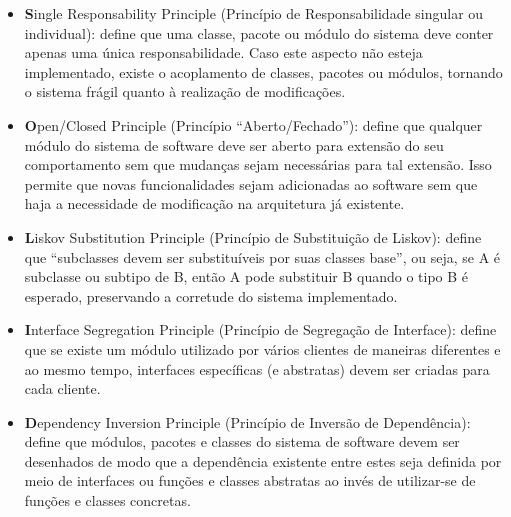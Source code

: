 \begin{itemize}

	\item \textbf{S}ingle Responsability Principle (Princípio de Responsabilidade singular ou individual): define que uma classe, pacote ou módulo do sistema deve conter apenas uma única responsabilidade. Caso este aspecto não esteja implementado, existe o acoplamento de classes, pacotes ou módulos, tornando o sistema frágil quanto à realização de modificações.
	\item \textbf{O}pen/Closed Principle (Princípio “Aberto/Fechado”): define que qualquer módulo do sistema de software deve ser aberto para extensão do seu comportamento sem que mudanças sejam necessárias para tal extensão. Isso permite que novas funcionalidades sejam adicionadas ao software sem que haja a necessidade de modificação na arquitetura já existente.
	\item \textbf{L}iskov Substitution Principle (Princípio de Substituição de Liskov): define que “subclasses devem ser substituíveis por suas classes base”, ou seja, se A é subclasse ou subtipo de B, então A pode substituir B quando o tipo B é esperado, preservando a corretude do sistema implementado.
	\item \textbf{I}nterface Segregation Principle (Princípio de Segregação de Interface): define que se existe um módulo utilizado por vários clientes de maneiras diferentes e ao mesmo tempo, interfaces específicas (e abstratas) devem ser criadas para cada cliente.
	\item \textbf{D}ependency Inversion Principle (Princípio de Inversão de Dependência): define que módulos, pacotes e classes do sistema de software devem ser desenhados de modo que a dependência existente entre estes seja definida por meio de interfaces ou funções e classes abstratas ao invés de utilizar-se de funções e classes concretas.

\end{itemize}

